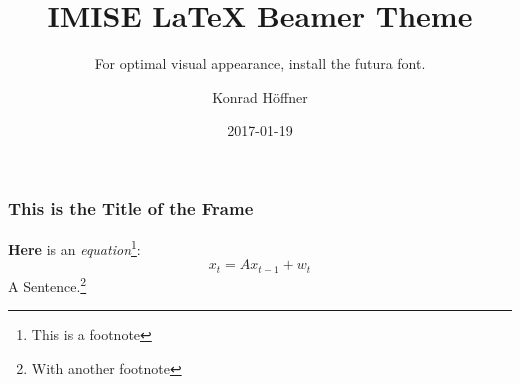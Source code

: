\documentclass{beamer}
\author{Konrad Höffner}
\date{2017-01-19}
\title{IMISE \LaTeX{} Beamer Theme}
\subtitle{For optimal visual appearance, install the futura font.}
\begin{document}
\begin{frame}
\titlepage
\end{frame}

\begin{frame}[fragile]
\frametitle{This is the Title of the Frame}
\textbf{Here} is an \emph{equation}\footnote{This is a footnote}:
\begin{equation}
x_t = Ax_{t-1} + w_t
\end{equation}
A Sentence.\footnote{With another footnote}
\end{frame}
\end{document}
